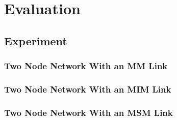 \chapter{Evaluation}
\label{evaluation}

\section{Experiment}
\subsection{Two Node Network With an MM Link}
\subsection{Two Node Network With an MIM Link}
\subsection{Two Node Network With an MSM Link}



